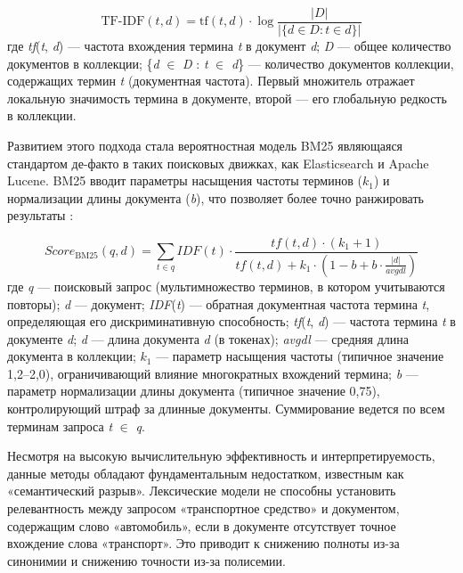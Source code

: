 \documentclass[a4paper, 12pt, oneside, openany]{article}
\begin{document}
\begin{equation}
	\mathrm{TF\text{-}IDF}(t,d) = \mathrm{tf}(t,d) \cdot \log\frac{|D|}{\bigl|\bigl\{ d \in D : t \in d \bigr\}\bigr|}
	\label{eq:1-1}
\end{equation}
где \emph{tf}(\emph{t}, \emph{d}) --- частота вхождения термина \emph{t} в документ \emph{d}; \textbar{}\emph{D}\textbar{} --- общее количество документов в коллекции; \textbar\{\emph{d} $\in$ \emph{D} : \emph{t} $\in$ \emph{d}\}\textbar{} --- количество документов коллекции, содержащих термин \emph{t} (документная частота). Первый множитель отражает локальную значимость термина в документе, второй --- его глобальную редкость в коллекции.

Развитием этого подхода стала вероятностная модель BM25 являющаяся стандартом де-факто в таких поисковых движках, как Elasticsearch и Apache Lucene. BM25 вводит параметры насыщения частоты терминов (\emph{$k_1$}) и нормализации длины документа (\emph{b}), что позволяет более точно ранжировать результаты \cite{ref15}:

\begin{equation}
	{Score}_{\mathrm{BM25}}(q,d) = \sum_{t \in q}^{}IDF(t) \cdot \frac{tf(t,d) \cdot \left( k_{1} + 1 \right)}{tf(t,d) + k_{1} \cdot \left( 1 - b + b \cdot \frac{|d|}{avgdl} \right)}
	\label{eq:1-2}
\end{equation}
где \emph{q} --- поисковый запрос (мультимножество терминов, в котором учитываются повторы); \emph{d} --- документ; \emph{IDF}(\emph{t}) --- обратная документная частота термина \emph{t}, определяющая его дискриминативную способность; \emph{tf}(\emph{t}, \emph{d}) --- частота термина \emph{t} в документе \emph{d}; \textbar{}\emph{d}\textbar{} --- длина документа \emph{d} (в токенах); \emph{avgdl} --- средняя длина документа в коллекции; \emph{$k_1$} --- параметр насыщения частоты (типичное значение 1,2--2,0), ограничивающий влияние многократных вхождений термина; \emph{b} --- параметр нормализации длины документа (типичное значение 0,75), контролирующий штраф за длинные документы. Суммирование ведется по всем терминам запроса \emph{t} $\in$ \emph{q}.

Несмотря на высокую вычислительную эффективность и интерпретируемость, данные методы обладают фундаментальным недостатком, известным как «семантический разрыв». Лексические модели не способны установить релевантность между запросом «транспортное средство» и документом, содержащим слово «автомобиль», если в документе отсутствует точное вхождение слова «транспорт». Это приводит к снижению полноты из-за синонимии и снижению точности из-за полисемии.
\end{document}
